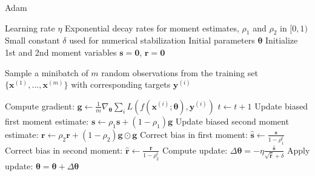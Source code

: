 \documentclass[./main.tex]{subfiles}
\begin{document}
\begin{algorithm}[htbp]
    \caption{Adam \cite{DL_book}}
    \label{Algorithm:ADAM}
    \begin{algorithmic}
        \Require Learning rate $\eta$
        \Require Exponential decay rates for moment estimates, $\rho_1$ and $\rho_2$ in $[0, 1)$
        \Require Small constant $\delta$ used for numerical stabilization
        \Require Initial parameters $\bm{\theta}$
        \State Initialize 1st and 2nd moment variables $\bm{s} = \bm{0}$, $\bm{r} = \bm{0}$

            \State \begin{varwidth}[t]{\linewidth} Sample a minibatch of $m$ random observations from the training set $\{\bm{x}^{(1)}, ..., \bm{x}^{(m)}\}$ with corresponding targets $\bm{y}^{(i)}$
            \end{varwidth}
            \State Compute gradient: $\bm{g}  \leftarrow  \frac{1}{m} \nabla_{\bm{\theta}} \sum_i L\left( f \left(\bm{x}^{(i)}; \bm{\theta} \right), \bm{y}^{(i)} \right)$
            \State $t \leftarrow t + 1$
            \State Update biased first moment estimate: $\bm{s} \leftarrow \rho_1 \bm{s} + (1 - \rho_1) \bm{g}$
            \State Update biased second moment estimate: $\bm{r} \leftarrow \rho_2 \bm{r} + (1 - \rho_2) \bm{g} \odot \bm{g}$
            \State Correct bias in first moment: $\hat{\bm{s}} \leftarrow \frac{\bm{s}}{1 - \rho_1 ^t}$
            \State Correct bias in second moment: $\hat{\bm{r}} \leftarrow \frac{\bm{r}}{1 - \rho_2 ^t}$
            \State Compute update: $\Delta \bm{\theta} = - \eta \frac{\hat{\bm{s}}}{\sqrt{\hat{\bm{r}}} + \delta}$
            \State Apply update: $\bm{\theta} = \bm{\theta} + \Delta \bm{\theta}$ 
        \EndWhile
    \end{algorithmic}
\end{algorithm}
\end{document}
